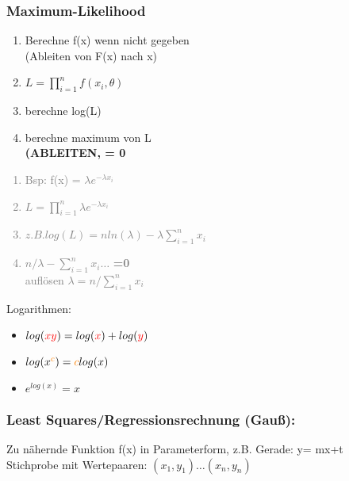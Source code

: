 \subsubsection*{Maximum-Likelihood}

\begin{minipage}{0.25\textwidth}
\begin{enumerate}
\item Berechne f(x) wenn nicht gegeben \\(Ableiten von F(x) nach x)
\item $L = \prod_{i=1}^n f(x_i,\theta)$
\item berechne log(L) 
\item berechne maximum von L \\\textbf{(ABLEITEN, = 0 } 
\end{enumerate}
\end{minipage}
\begin{minipage}{0.25\textwidth}
\textcolor{gray}{
\begin{enumerate}
\item Bsp: f(x) = $\lambda e^ {-\lambda x_i}$\\
\item $ L = \prod_{i=1}^n \lambda e^ {-\lambda x_i}$
\item $	z.B. log(L) = n ln(\lambda) -\lambda \sum_{i=1}^n x_i $
\item $n/\lambda - \sum_{i=1}^n x_i \dots$ \textbf{=0}\\
auflösen $\lambda = n/ \sum_{i=1}^n x_i$
\end{enumerate}}
\end{minipage}

\newcommand{\bc}{\textcolor{orange}{c}}
\newcommand{\red}[1]{\textcolor{red}{#1}}

Logarithmen:
\begin{itemize}
\item $log(\red{xy}) = log(\red{x}) + log(\red{y})$
\item $log(x^{\bc}) = \bc log(x)$
\item $e^{log(x)} = x$
\end{itemize}

\subsubsection*{Least Squares/Regressionsrechnung (Gauß):}
Zu nähernde Funktion f(x) in Parameterform, z.B. Gerade: y= mx+t\\
Stichprobe mit Wertepaaren: $(x_1,y_1)\dots (x_n,y_n)$

